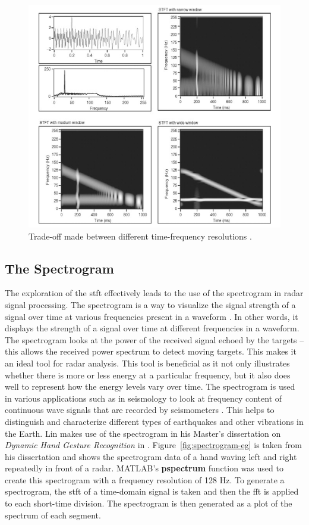 \documentclass[class=report,11pt,crop=false]{standalone}
\begin{document}
\begin{figure}[htbp]
    \centering
    \includegraphics[width=0.6\columnwidth]{../Images/tradeoff.png}
    \caption{Trade-off made between different time-frequency resolutions \cite{nasser}.}
    \label{fig:tradeoff}
\end{figure}


\subsection{The Spectrogram}
The exploration of the \gls{stft} effectively leads to the use of the spectrogram in \gls{radar} signal processing. The spectrogram is a way to visualize the signal strength of a signal over time at various frequencies present in a waveform \cite{yan, griffaton}. In other words, it displays the strength of a signal over time at different frequencies in a waveform. The spectrogram looks at the power of the received signal echoed by the targets – this allows the received power spectrum to detect moving targets. This makes it an ideal tool for radar analysis. This tool is beneficial as it not only illustrates whether there is more or less energy at a particular frequency, but it also does well to represent how the energy levels vary over time. The spectrogram is used in various applications such as in seismology to look at frequency content of continuous wave signals that are recorded by seismometers \cite{yan}. This helps to distinguish and characterize different types of earthquakes and other vibrations in the Earth. Lin makes use of the spectrogram in his Master's dissertation on \emph{Dynamic Hand Gesture Recognition} in \cite{clin}. Figure~\ref{fig:spectrogram-eg} is taken from his dissertation and shows the spectrogram data of a hand waving left and right repeatedly in front of a \gls{radar}. \textsc{MATLAB}'s \textbf{pspectrum} function was used to create this spectrogram with a frequency resolution of 128 Hz. To generate a spectrogram, the \gls{stft} of a time-domain signal is taken and then the \gls{fft} is applied to each short-time division. The spectrogram is then generated as a plot of the spectrum of each segment.
\end{document}
